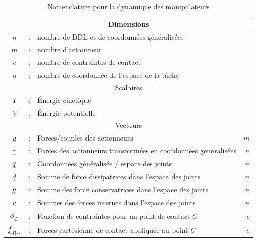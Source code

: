 \begin{table}[H]
	\centering
	\caption{Nomenclature pour la dynamique des manipulateurs}	%
		\begin{tabular}{ c c l r }
        \hline \hline
				\multicolumn{4}{c}{Dimensions} \\
				\hline \hline
			$n$             &  :  & nombre de DDL et de coordonnées généralisées                                         & \\
			$m$             &  :  & nombre d'actionneur                                       & \\
			$c$             &  :  & nombre de contraintes de contact                             & \\
			$o$             &  :  & nombre de coordonnée de l'espace de la tâche                        & \\ 
            \hline \hline
			\multicolumn{4}{c}{Scalaires} \\
			\hline \hline
            $T$    &  :  & Énergie cinétique           &   \\
            $V$    &  :  & Énergie potentielle         &   \\
			\hline \hline
			\multicolumn{4}{c}{Vecteurs} \\
			\hline \hline
			$\underline{u}$    &  :  & Forces/couples des actionneurs                                   & $m$  \\
            $\underline{\tau}$    &  :  & Forces des actionneurs transformées en coordonnées généralisées                              & $n$  \\
			$\underline{q}$       &  :  & Coordonnées généralisée / espace des joints    & $n$  \\
			$\underline{d}$       &  :  & Somme de force dissipatrices dans l'espace des joints                             & $n$  \\
			$\underline{g}$       &  :  & Somme des force conservatrices dans l'espace des joints                             & $n$  \\
			$\underline{c}$       &  :  & Sommes des forces internes dans l'espace des joints               & $n$  \\
			$\underline{\phi}_C$    &  :  & Fonction de contraintes pour un point de contact $C$                                          & $c$  \\
			$\underline{f}_{R_C}$     &  :  & Forces cartésienne de contact appliquée au point $C$                                  & $c$  \\

\end{tabular}
\end{table}
